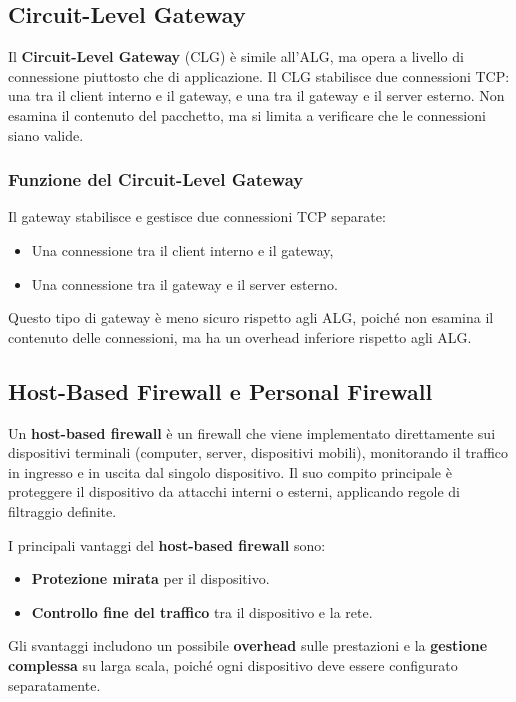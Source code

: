 \subsection{Circuit-Level Gateway}
Il \textbf{Circuit-Level Gateway} (CLG) è simile all'ALG, ma opera a livello di connessione piuttosto che di applicazione. Il CLG stabilisce due connessioni TCP: una tra il client interno e il gateway, e una tra il gateway e il server esterno. Non esamina il contenuto del pacchetto, ma si limita a verificare che le connessioni siano valide.

\subsubsection{Funzione del Circuit-Level Gateway}
Il gateway stabilisce e gestisce due connessioni TCP separate:
\begin{itemize}
  \item Una connessione tra il client interno e il gateway,
  \item Una connessione tra il gateway e il server esterno.
\end{itemize}

Questo tipo di gateway è meno sicuro rispetto agli ALG, poiché non esamina il contenuto delle connessioni, ma ha un overhead inferiore rispetto agli ALG.
\subsection{Host-Based Firewall e Personal Firewall}

Un \textbf{host-based firewall} è un firewall che viene implementato direttamente sui dispositivi terminali (computer, server, dispositivi mobili), monitorando il traffico in ingresso e in uscita dal singolo dispositivo. Il suo compito principale è proteggere il dispositivo da attacchi interni o esterni, applicando regole di filtraggio definite.

I principali vantaggi del \textbf{host-based firewall} sono:
\begin{itemize}
  \item \textbf{Protezione mirata} per il dispositivo.
  \item \textbf{Controllo fine del traffico} tra il dispositivo e la rete.
\end{itemize}
Gli svantaggi includono un possibile \textbf{overhead} sulle prestazioni e la \textbf{gestione complessa} su larga scala, poiché ogni dispositivo deve essere configurato separatamente.

